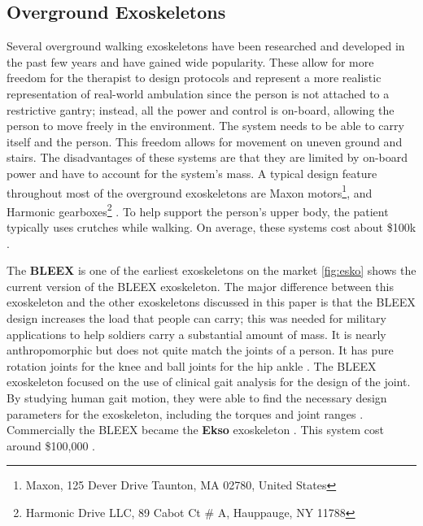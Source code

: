\subsection{Overground Exoskeletons}

Several overground walking exoskeletons have been researched and developed in the past few years and have gained wide popularity. These allow for more freedom for the therapist to design protocols and represent a more realistic representation of real-world ambulation \cite{8110705} since the person is not attached to a restrictive gantry; instead, all the power and control is on-board, allowing the person to move freely in the environment. The system needs to be able to carry itself and the person. This freedom allows for movement on uneven ground and stairs. The disadvantages of these systems are that they are limited by on-board power and have to account for the system's mass.  A typical design feature throughout most of the overground exoskeletons are Maxon motors\footnote{Maxon, 125 Dever Drive Taunton, MA 02780, United States}, and Harmonic gearboxes\footnote{Harmonic Drive LLC, 89 Cabot Ct # A, Hauppauge, NY 11788} \cite{bortole2015h2} \cite{aliman2017design}. To help support the person's upper body, the patient typically uses crutches while walking. On average, these systems cost about \$100k \cite{rupal2017lower}.


The \textbf{BLEEX} is one of the earliest exoskeletons on the market \autoref{fig:esko} shows the current version of the BLEEX exoskeleton. The major difference between this exoskeleton and the other exoskeletons discussed in this paper is that the BLEEX design increases the load that people can carry; this was needed for military applications to help soldiers carry a substantial amount of mass. It is nearly anthropomorphic but does not quite match the joints of a person. It has pure rotation joints for the knee and ball joints for the hip ankle \cite{chu2005biomimetic}\cite{zoss2006biomechanical}. The BLEEX exoskeleton focused on the use of clinical gait analysis for the design of the joint. By studying human gait motion, they were able to find the necessary design parameters for the exoskeleton, including the torques and joint ranges \cite{zoss2005mechanical}. Commercially the BLEEX became the \textbf{Ekso} exoskeleton \cite{zoss2016human}. This system cost around \$100,000 \cite{nichols_2018}. 


